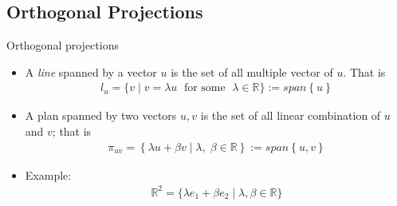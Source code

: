 



\subsection{Orthogonal Projections}
\begin{frame}{Orthogonal projections}
\begin{itemize}
\item A \textit{line} spanned by a vector $u$ is the set of all multiple vector of $u$. That is
\begin{align*}
    l_u = \{ v\mid  v = \lambda u \;\text{ for some } \; \lambda \in \mathbb{R}\} := span \left\{ u\right\}
\end{align*}
\item A plan spanned by two vectors $u,v$ is the set of all  linear combination of $u$ and $v$; that is 
\begin{align}
    \pi_{uv} = \left\{\lambda u + \beta v \mid \lambda, \; \beta\in \mathbb{R} \right\} := span \left\{ u,v\right\}
\end{align}
\item Example: 
\begin{align*}
    \mathbb{R}^2 = \{\lambda e_1 + \beta e_2 \mid \lambda, \beta\in \mathbb{R} \}
\end{align*}
\end{itemize}
\end{frame}

